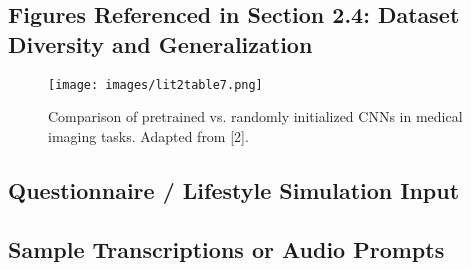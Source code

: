 \documentclass[12pt]{article}
\begin{document}
\subsection{Figures Referenced in Section 2.4: Dataset Diversity and Generalization}

\begin{figure}[H]
    \centering
    \texttt{[image: images/lit2table7.png]}
    \caption{Comparison of pretrained vs. randomly initialized CNNs in medical imaging tasks. Adapted from [2].}
    \label{fig:lit2table7}
\end{figure}

\subsection{Questionnaire / Lifestyle Simulation Input}
\subsection{Sample Transcriptions or Audio Prompts}

\newpage
\end{document}
